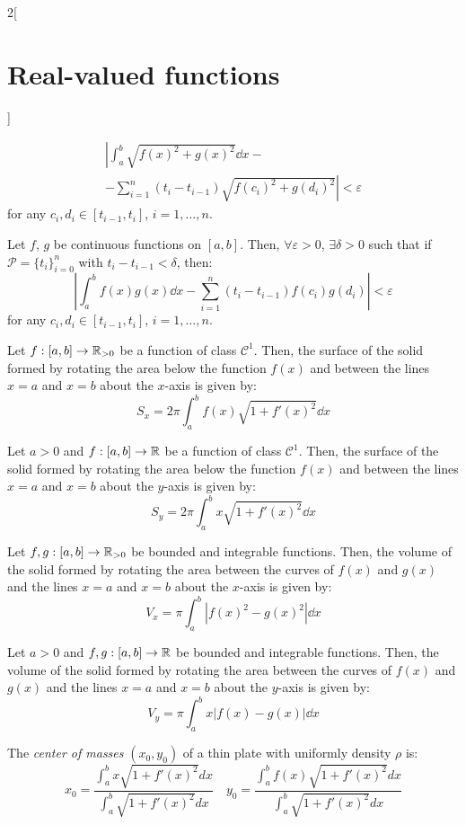 \documentclass[../../../main_math.tex]{subfiles}
\begin{document}
\begin{multicols}{2}[\section{Real-valued functions}]
\begin{lemma}
\begin{multline*}
      \left|\int_a^b\sqrt{{f(x)}^2+{g(x)}^2}\dd{x}\right.-\\-\left.\sum_{i=1}^n(t_i-t_{i-1})\sqrt{{f(c_i)}^2+{g(d_i)}^2}\right|<\varepsilon
    \end{multline*}
    for any $c_i,d_i\in[t_{i-1},t_i]$, $i=1,\ldots,n$.
  \end{lemma}
  \begin{lemma}
    Let $f$, $g$ be continuous functions on $[a,b]$. Then, $\forall\varepsilon>0$, $\exists\delta>0$ such that if $\mathcal{P}=\{t_i\}_{i=0}^n$ with $t_i-t_{i-1}<\delta$, then:
    $$\left|\int_a^bf(x)g(x)\dd{x}-\sum_{i=1}^n(t_i-t_{i-1})f(c_i)g(d_i)\right|<\varepsilon$$
    for any $c_i,d_i\in[t_{i-1},t_i]$, $i=1,\ldots,n$.
  \end{lemma}
  \begin{proposition}
    Let $f:[a,b]\rightarrow\mathbb{R}_{>0}$ be a function of class $\mathcal{C}^1$. Then, the surface of the solid formed by rotating the area below the function $f(x)$ and between the lines $x = a$ and $x = b$ about the $x$-axis is given by: $$S_x=2\pi\int_a^bf(x)\sqrt{1+{f'(x)}^2}\dd{x}$$
  \end{proposition}
  \begin{proposition}
    Let $a>0$ and $f:[a,b]\rightarrow\mathbb{R}$ be a function of class $\mathcal{C}^1$. Then, the surface of the solid formed by rotating the area below the function $f(x)$ and between the lines $x = a$ and $x = b$ about the $y$-axis is given by: $$S_y=2\pi\int_a^bx\sqrt{1+{f'(x)}^2}\dd{x}$$
  \end{proposition}
  \begin{proposition}
    Let $f,g:[a,b]\rightarrow\mathbb{R}_{>0}$ be bounded and integrable functions. Then, the volume of the solid formed by rotating the area between the curves of $f(x)$ and $g(x)$ and the lines $x = a$ and $x = b$ about the $x$-axis is given by: $$V_x=\pi\int_a^b\left|{f(x)}^2-{g(x)}^2\right|\dd{x}$$
  \end{proposition}
  \begin{proposition}
    Let $a>0$ and $f,g:[a,b]\rightarrow\mathbb{R}$ be bounded and integrable functions. Then, the volume of the solid formed by rotating the area between the curves of $f(x)$ and $g(x)$ and the lines $x = a$ and $x = b$ about the $y$-axis is given by: $$V_y=\pi\int_a^bx\left|f(x)-g(x)\right|\dd{x}$$
  \end{proposition}
  \begin{proposition}
    The \emph{center of masses} $(x_0,y_0)$ of a thin plate with uniformly density $\rho$ is: $$x_0=\frac{\displaystyle\int_a^bx\sqrt{1+{f'(x)}^2}dx}{\displaystyle\int_a^b\sqrt{1+{f'(x)}^2}dx}\quad y_0=\frac{\displaystyle\int_a^b f(x)\sqrt{1+{f'(x)}^2}dx}{\displaystyle\int_a^b\sqrt{1+{f'(x)}^2}dx}$$
  \end{proposition}

\end{multicols}
\end{document}
